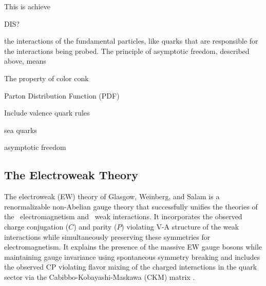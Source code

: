 This is achieve

DIS?

the interactions of the fundamental particles, like quarks that
are responsible for the interactions being probed. The principle
of asymptotic freedom, described above, means

The property of color conk

Parton Distribution Function (PDF)

Include valence quark rules

sea quarks

asymptotic freedom

\subsection{The Electroweak Theory}
\label{sec:theory_ew}
The electroweak (EW) 
theory of Glasgow, Weinberg, and 
Salam \cite{glashow:1961tr,Salam:1968rm,weinberg:1967tq}
is a renormalizable \cite{hooft1971renormalization,Hooft1971167}
non-Abelian gauge theory 
that successfully unifies the theories 
of the \uone~electromagnetism and \sutwo~weak interactions.
It incorporates the observed 
charge conjugation ($C$) 
and parity ($P$) violating V-A structure of the weak interactions
\cite{PhysRev.105.1413,Garwin:1957hc,PhysRev.106.1290}
while simultaneously preserving these symmetries for electromagnetism.
It explains the presence of the massive EW gauge bosons 
while maintaining gauge invariance
using spontaneous symmetry breaking
and includes the observed CP violating 
\cite{PhysRevLett.13.138} 
flavor mixing of the 
charged interactions in the quark sector via 
the Cabibbo-Kobayashi-Maskawa  (CKM)
matrix \cite{Cabibbo:1963yz,Kobayashi:1973fv}.

